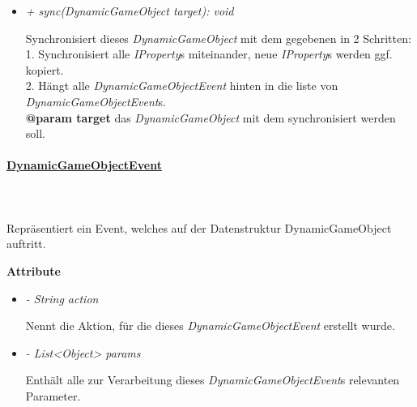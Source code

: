 \begin{itemize}
                \pagebreak
                \item \textit{+ sync(DynamicGameObject target): void}
                    \begin{leftbar}[0.9\linewidth]
                        Synchronisiert dieses \textit{DynamicGameObject} mit dem gegebenen in 2 Schritten:\\
                        1. Synchronisiert alle \textit{IProperty}s miteinander, neue \textit{IProperty}s werden ggf. kopiert.\\
                        2. Hängt alle \textit{DynamicGameObjectEvent} hinten in die liste von \textit{DynamicGameObjectEvent}s.\\
                        \textbf{@param target} das \textit{DynamicGameObject} mit dem synchronisiert werden soll.
                    \end{leftbar}
            \end{itemize}

        \paragraph{\underline{DynamicGameObjectEvent}} \mbox{}\\
        \\
            Repräsentiert ein Event, welches auf der Datenstruktur DynamicGameObject auftritt.\par

            \textbf{Attribute}
            \begin{itemize}
                \item \textit{- String action}
                    \begin{leftbar}[0.9\linewidth]
                        Nennt die Aktion, für die dieses \textit{DynamicGameObjectEvent} erstellt wurde.
                    \end{leftbar}
                \item \textit{- List<Object> params}
                    \begin{leftbar}[0.9\linewidth]
                        Enthält alle zur Verarbeitung dieses \textit{DynamicGameObjectEvent}s relevanten Parameter.
                    \end{leftbar}
            \end{itemize}

